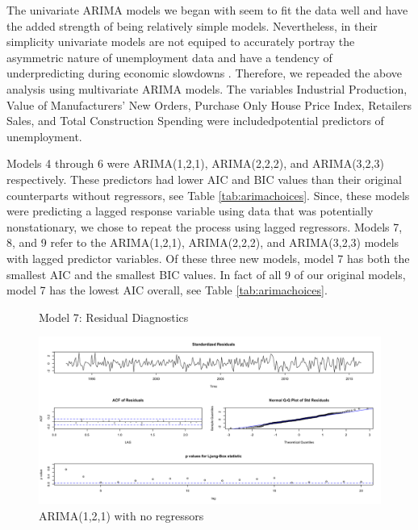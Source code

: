 \documentclass[twoside,twocolumn]{article}
\begin{document}
The univariate ARIMA models we began with seem to fit the data well and have the added strength of being relatively simple models. Nevertheless, in their simplicity univariate models are not equiped to accurately portray the asymmetric nature of unemployment data and have a tendency of underpredicting during economic slowdowns \citep{Montgomery1998}. Therefore, we repeaded the above analysis using multivariate ARIMA models.  The variables Industrial Production, Value of Manufacturers' New Orders, Purchase Only House Price Index,  Retailers Sales, and Total Construction Spending were includedpotential predictors of unemployment. 

Models 4 through 6 were ARIMA(1,2,1), ARIMA(2,2,2), and ARIMA(3,2,3) respectively.  These predictors had lower AIC and BIC values than their original counterparts without regressors, see Table \ref{tab:arimachoices}. Since, these models were predicting a lagged response variable using data that was potentially nonstationary, we chose to repeat the process using lagged regressors.  Models 7, 8, and 9 refer to the ARIMA(1,2,1), ARIMA(2,2,2), and ARIMA(3,2,3) models with lagged predictor variables.  Of these three new models, model 7 has both the smallest AIC and the smallest BIC values. In fact of all 9 of our original models, model 7 has the lowest AIC overall, see Table \ref{tab:arimachoices}.  


		    \begin{figure}[htb]
    	\centering
    	\caption{Model 7: Residual Diagnostics}
     	\includegraphics[width=\linewidth]{images/sarima1}
     	\caption*{ARIMA(1,2,1) with no regressors}
     	\label{fig:sarimamod1}
     \end{figure}
\end{document}
